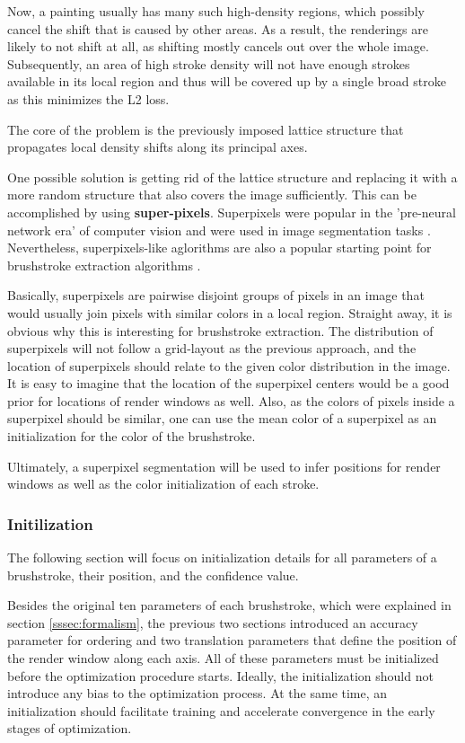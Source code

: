 Now, a painting usually has many such high-density regions, which possibly cancel the shift that is caused by other areas.
As a result, the renderings are likely to not shift at all, as shifting mostly cancels out over the whole image.
Subsequently, an area of high stroke density will not have enough strokes available in its local region and thus will be covered up by a single broad stroke as this minimizes the L2 loss.

The core of the problem is the previously imposed lattice structure that propagates local density shifts along its principal axes.

One possible solution is getting rid of the lattice structure and replacing it with a more random structure that also covers the image sufficiently.
This can be accomplished by using \textbf{super-pixels}.
Superpixels were popular in the 'pre-neural network era' of computer vision and were used in image segmentation tasks \cite{superpixel_segmentation}.
Nevertheless, superpixels-like aglorithms are also a popular starting point for brushstroke extraction algorithms \cite{lamberti}.

Basically, superpixels are pairwise disjoint groups of pixels in an image that would usually join pixels with similar colors in a local region.
Straight away, it is obvious why this is interesting for brushstroke extraction.
The distribution of superpixels will not follow a grid-layout as the previous approach, and the location of superpixels should relate to the given color distribution in the image.
It is easy to imagine that the location of the superpixel centers would be a good prior for locations of render windows as well.
Also, as the colors of pixels inside a superpixel should be similar, one can use the mean color of a superpixel as an initialization for the color of the brushstroke.

Ultimately, a superpixel segmentation will be used to infer positions for render windows as well as the color initialization of each stroke.

\subsubsection{Initilization}

The following section will focus on initialization details for all parameters of a brushstroke, their position, and the confidence value.

Besides the original ten parameters of each brushstroke, which were explained in section \ref{sssec:formalism}, the previous two sections introduced an accuracy parameter for ordering and two translation parameters that define the position of the render window along each axis.
All of these parameters must be initialized before the optimization procedure starts.
Ideally, the initialization should not introduce any bias to the optimization process.
At the same time, an initialization should facilitate training and accelerate convergence in the early stages of optimization.

